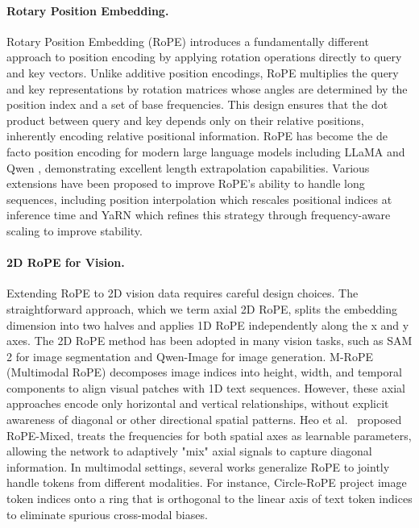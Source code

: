 \paragraph{Rotary Position Embedding.}
Rotary Position Embedding (RoPE) \cite{suRoFormerEnhancedTransformer2023} introduces a fundamentally different approach to position encoding by applying rotation operations directly to query and key vectors. Unlike additive position encodings, RoPE multiplies the query and key representations by rotation matrices whose angles are determined by the position index and a set of base frequencies. This design ensures that the dot product between query and key depends only on their relative positions, inherently encoding relative positional information. RoPE has become the de facto position encoding for modern large language models including LLaMA \cite{touvronLLaMAOpenEfficient2023} and Qwen \cite{yangQwen3TechnicalReport2025}, demonstrating excellent length extrapolation capabilities. Various extensions have been proposed to improve RoPE's ability to handle long sequences, including position interpolation \cite{chenExtendingContextWindow2023} which rescales positional indices at inference time and YaRN \cite{pengYaRNEfficientContext2023} which refines this strategy through frequency-aware scaling to improve stability.

\paragraph{2D RoPE for Vision.}
Extending RoPE to 2D vision data requires careful design choices. The straightforward approach, which we term axial 2D RoPE, splits the embedding dimension into two halves and applies 1D RoPE independently along the x and y axes. The 2D RoPE method has been adopted in many vision tasks, such as SAM 2 \cite{raviSAM2Segment2024} for image segmentation and Qwen-Image \cite{wuQwenImageTechnicalReport2025} for image generation. M-RoPE (Multimodal RoPE) \cite{wangQwen2VLEnhancingVisionLanguage2024} decomposes image indices into height, width, and temporal components to align visual patches with 1D text sequences. However, these axial approaches encode only horizontal and vertical relationships, without explicit awareness of diagonal or other directional spatial patterns. Heo et al.~\cite{heoRotaryPositionEmbedding2024} proposed RoPE-Mixed, treats the frequencies for both spatial axes as learnable parameters, allowing the network to adaptively "mix" axial signals to capture diagonal information. In multimodal settings, several works generalize RoPE to jointly handle tokens from different modalities. For instance, Circle-RoPE \cite{wangCircleRoPEConelikeDecoupled2025} project image token indices onto a ring that is orthogonal to the linear axis of text token indices to eliminate spurious cross-modal biases.
